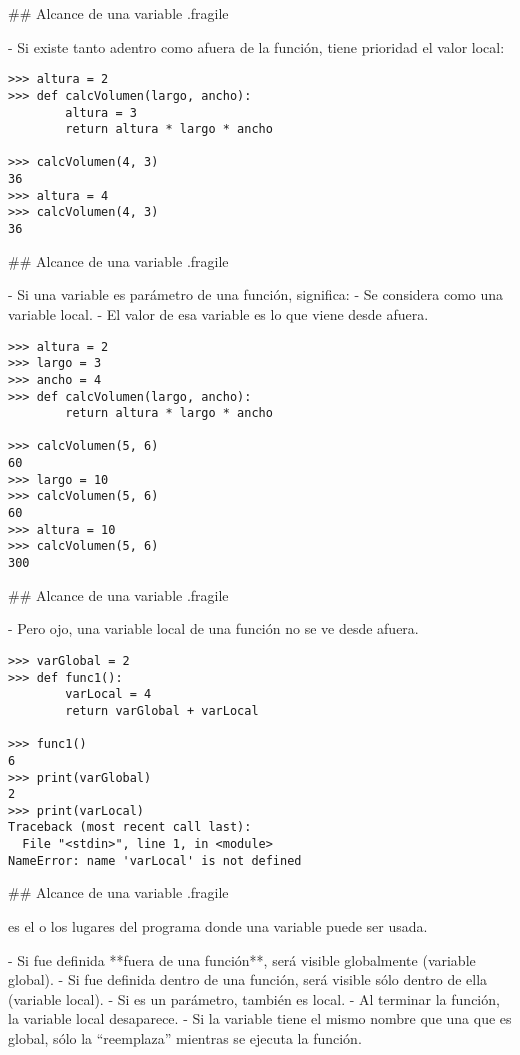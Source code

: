 ## Alcance de una variable {.fragile} 

- Si existe tanto adentro como afuera de la función, tiene prioridad el valor local:

\begin{lstlisting}[style=frame02,linebackgroundcolor={\btLstHL{1,3,8}}]
>>> altura = 2
>>> def calcVolumen(largo, ancho):
        altura = 3
        return altura * largo * ancho

>>> calcVolumen(4, 3)
36
>>> altura = 4
>>> calcVolumen(4, 3)
36
\end{lstlisting}

## Alcance de una variable {.fragile} 

- Si una variable es parámetro de una función, significa:
    - Se considera como una variable local.
    - El valor de esa variable es lo que viene desde afuera.

\begin{lstlisting}[style=frame02]
>>> altura = 2
>>> largo = 3
>>> ancho = 4
>>> def calcVolumen(largo, ancho):
        return altura * largo * ancho

>>> calcVolumen(5, 6)
60
>>> largo = 10
>>> calcVolumen(5, 6)
60
>>> altura = 10
>>> calcVolumen(5, 6)
300
\end{lstlisting}

## Alcance de una variable {.fragile} 

- Pero ojo, una variable local de una función no se ve desde afuera.

\begin{lstlisting}
>>> varGlobal = 2
>>> def func1():
        varLocal = 4
        return varGlobal + varLocal

>>> func1()
6
>>> print(varGlobal)
2
>>> print(varLocal)
Traceback (most recent call last):
  File "<stdin>", line 1, in <module>
NameError: name 'varLocal' is not defined
\end{lstlisting}


## Alcance de una variable {.fragile} 

\bgnblockdefinition
{} es el o los lugares del programa donde una variable puede ser usada.
\trmblockdefinition

\vfill


- Si fue definida **fuera de una función**, será visible globalmente (\textcolor{structure}{variable global}).
- Si fue definida dentro de una función, será visible sólo dentro de ella (\textcolor{structure}{variable local}).
    - Si es un parámetro, también es local.
    - Al terminar la función, la variable local desaparece.
    - Si la variable tiene el mismo nombre que una que es global, sólo
    la ``reemplaza'' mientras se ejecuta la función.

